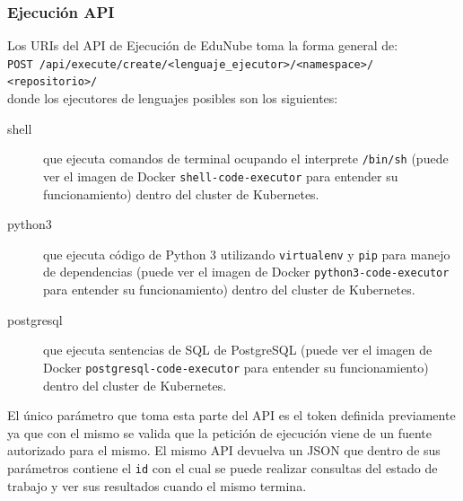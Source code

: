 \subsubsection{Ejecución API}
Los URIs del API de Ejecución de EduNube toma la forma general de: \\
\texttt{POST /api/execute/create/<lenguaje\_ejecutor>/<namespace>/} \\
\texttt{<repositorio>/} \\
donde los ejecutores de lenguajes posibles son los siguientes:
\begin{description}
	\item[shell] que ejecuta comandos de terminal ocupando el interprete \texttt{/bin/sh} (puede ver el imagen de Docker \texttt{shell-code-executor} para entender su funcionamiento) dentro del cluster de Kubernetes.
	\item[python3] que ejecuta código de Python 3 utilizando \texttt{virtualenv} y \texttt{pip} para manejo de dependencias (puede ver el imagen de Docker \texttt{python3-code-executor} para entender su funcionamiento) dentro del cluster de Kubernetes.
	\item[postgresql] que ejecuta sentencias de SQL de PostgreSQL (puede ver el imagen de Docker \texttt{postgresql-code-executor} para entender su funcionamiento) dentro del cluster de Kubernetes.
\end{description}
El único parámetro que toma esta parte del API es el token definida previamente ya que con el mismo se valida que la petición de ejecución viene de un fuente autorizado para el mismo. El mismo API devuelva un JSON que dentro de sus parámetros contiene el \texttt{id} con el cual se puede realizar consultas del estado de trabajo y ver sus resultados cuando el mismo termina.
